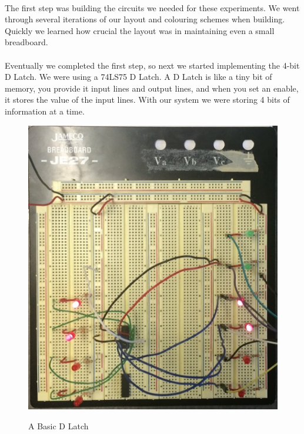\documentclass[12pt,a4paper]{report}
\begin{document}
\paragraph{} 
The first step was building the circuits we needed for these experiments. We went through several iterations of our layout and colouring schemes when building. Quickly we learned how crucial the layout was in maintaining even a small breadboard. 
\paragraph{}
Eventually we completed the first step, so next we started implementing the 4-bit D Latch. We were using a 74LS75 D Latch. A D Latch is like a tiny bit of memory, you provide it input lines and output lines, and when you set an enable, it stores the value of the input lines. With our system we were storing 4 bits of information at a time. 

\begin{figure}
	\centering
	\includegraphics[scale=.3]{img/finished_latch} \\
	\caption{A Basic D Latch	}
\end{figure}
\end{document}
